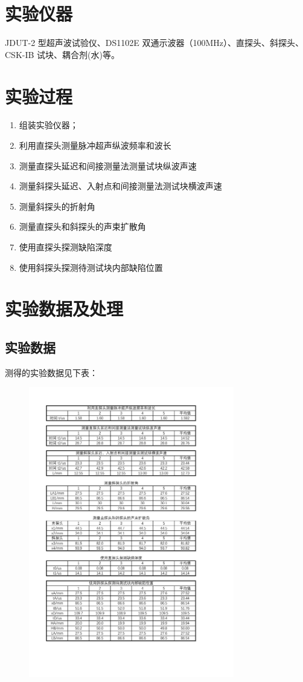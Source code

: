 \documentclass[a4paper,utf8]{article}
\begin{document}
\section{实验仪器}%
    JDUT-2 型超声波试验仪、DS1102E 双通示波器（100MHz）、直探头、斜探头、CSK-IB 试块、耦合剂(水)等。
\section{实验过程}%
    \begin{enumerate}
        \item 组装实验仪器；
        \item 利用直探头测量脉冲超声纵波频率和波长
        \item 测量直探头延迟和间接测量法测量试块纵波声速
        \item 测量斜探头延迟、入射点和间接测量法测试块横波声速
        \item 测量斜探头的折射角
        \item 测量直探头和斜探头的声束扩散角
        \item 使用直探头探测缺陷深度
        \item 使用斜探头探测待测试块内部缺陷位置
    \end{enumerate}
\section{实验数据及处理}
    \subsection{实验数据}
        测得的实验数据见下表：
        \begin{figure}[!ht]
            \includegraphics[width=0.8\textwidth]{result.pdf}
        \end{figure}
    
    
\end{document}
